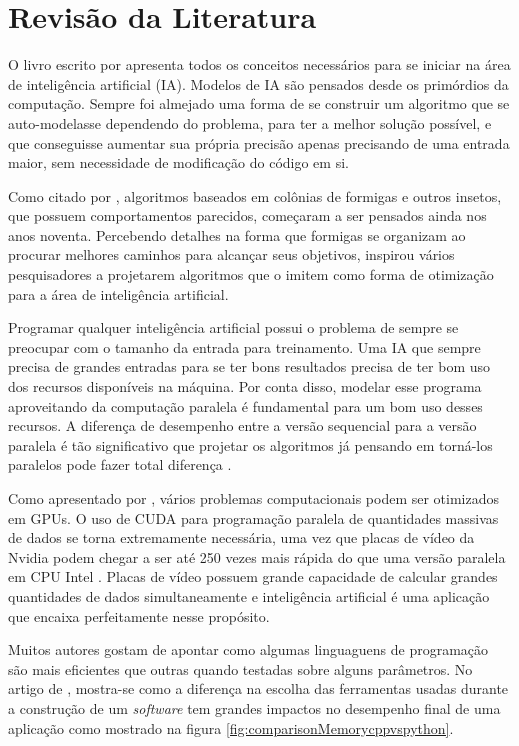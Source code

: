 \section{Revisão da Literatura}

O livro escrito por \citeauthor{BookIA} \cite{BookIA} apresenta todos os conceitos necessários para se iniciar na área de inteligência artificial (IA).
Modelos de IA são pensados desde os primórdios da computação. Sempre foi almejado uma forma de se construir um algoritmo
que se auto-modelasse dependendo do problema, para ter a melhor solução possível,
e que conseguisse aumentar sua própria precisão apenas precisando de uma entrada maior, sem necessidade de modificação
do código em si.

Como citado por \citeauthor{AntColonyOptimization} \cite{AntColonyOptimization}, algoritmos baseados em colônias de formigas
e outros insetos, que possuem comportamentos parecidos, começaram a ser pensados ainda nos anos noventa.
Percebendo detalhes na forma que formigas se organizam ao procurar melhores
caminhos para alcançar seus objetivos, inspirou vários pesquisadores a projetarem algoritmos que o imitem como forma
de otimização para a área de inteligência artificial.

Programar qualquer inteligência artificial possui o problema de sempre se preocupar com o tamanho da entrada para treinamento.
Uma IA que sempre precisa de grandes entradas para se ter bons resultados precisa de ter bom uso dos recursos disponíveis na máquina.
Por conta disso, modelar esse programa aproveitando da computação paralela é fundamental para um bom uso desses recursos.
A diferença de desempenho entre a versão sequencial para a versão paralela é tão significativo que projetar os algoritmos
já pensando em torná-los paralelos pode fazer total diferença \cite{SequentialVSParallel}.

Como apresentado por \citeauthor{ParallelComputingCUDA}, vários problemas computacionais podem ser otimizados em GPUs.
O uso de CUDA para programação paralela de quantidades massivas de dados se torna extremamente necessária, uma vez que
placas de vídeo da Nvidia podem chegar a ser até 250 vezes mais rápida do que uma versão paralela em CPU Intel \cite{ParallelComputingCUDA}.
Placas de vídeo possuem grande capacidade de calcular grandes quantidades de dados simultaneamente e inteligência artificial
é uma aplicação que encaixa perfeitamente nesse propósito.

Muitos autores gostam de apontar como algumas linguaguens de programação são mais eficientes que outras
quando testadas sobre alguns parâmetros.
No artigo  de \citeauthor{C++vsPython}, mostra-se como a diferença na escolha das ferramentas
usadas durante a construção de um \emph{software} tem grandes impactos no desempenho final de uma aplicação como
mostrado na figura \ref{fig:comparisonMemorycppvspython}.

